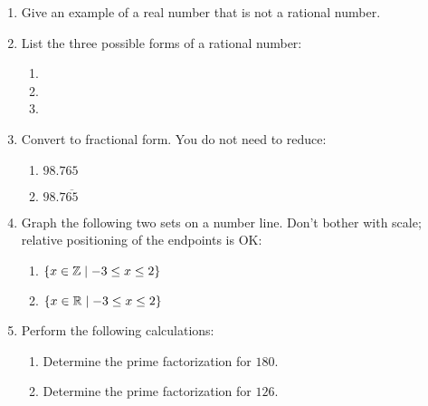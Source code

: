 \documentclass[letterpaper,12pt,fleqn]{article}
\begin{document}
\begin{enumerate}
\item Give an example of a real number that is not a rational number.

  \vspace{0.25in}
  
\item List the three possible forms of a rational number:
  \begin{enumerate}
  \item \fillin
  \item \fillin
  \item \fillin
  \end{enumerate}

  \bigskip

\item Convert to fractional form. You do not need to reduce:
  \begin{enumerate}
  \item $98.765$

    \vspace{1in}
    
  \item $98.7\overline{65}$

  \end{enumerate}

  \newpage

\item Graph the following two sets on a number line. Don't bother with scale;
  relative positioning of the endpoints is OK:
  \begin{enumerate}
  \item $\{x\in\mathbb{Z}\mid -3\le x\le 2\}$

    \vspace{2in}
    
  \item $\{x\in\mathbb{R}\mid -3\le x\le 2\}$

  \end{enumerate}

  \newpage

\item Perform the following calculations:
  \begin{enumerate}
  \item Determine the prime factorization for $180$.

    \vspace{1in}
    
  \item Determine the prime factorization for $126$.

    \vspace{1in}
    

\end{enumerate}
\end{enumerate}
\end{document}

